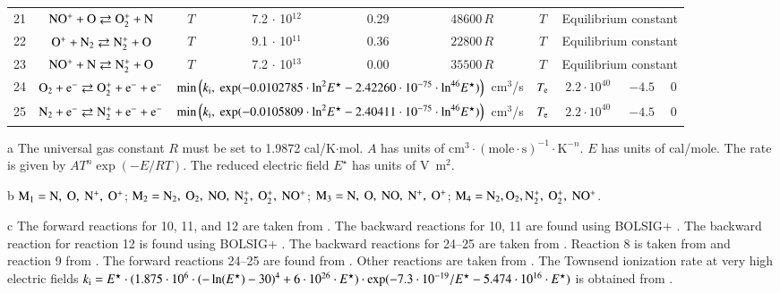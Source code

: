 \documentclass{warpdoc}
\begin{document}
\begin{table}[t]
\begin{center}
\begin{threeparttable}
\begin{tabular}{cccccccccc}
21 & $\rm NO^+ + O \rightleftarrows O_2^+ + N $ & $T$   & 7.2 $\cdot$ 10$^{12}$  & 0.29 & $48600 \, R$ & $T$ & \multicolumn{3}{c}{Equilibrium constant}\\

22 & $\rm O^+ + N_2 \rightleftarrows N_2^+ + O $ & $T$  & 9.1 $\cdot$ 10$^{11}$  & 0.36 & $22800 \, R$ & $T$  & \multicolumn{3}{c}{Equilibrium constant}\\

23 & $\rm NO^+ + N \rightleftarrows N_2^+ + O $  & $T$  & 7.2 $\cdot$ 10$^{13}$  & 0.00 & $35500 \, R$ & $T$ & \multicolumn{3}{c}{Equilibrium constant}\\

24 & $\rm O_2 + e^- \rightleftarrows O_2^+ + e^- + e^-$ &\multicolumn{4}{c}{$\min\left(k_{\rm i},~{\rm exp}(-0.0102785\cdot {\rm ln}^2 E^\star - 2.42260\cdot 10^{-75} \cdot {\rm ln}^{46}E^\star)\right)$~cm$^3$/s} 
                                          &$T_{\rm e}$ & $2.2 \cdot 10^{40}$  & $-4.5$  & 0\\
25 & $\rm N_2 + e^- \rightleftarrows N_2^+ + e^- + e^-$ &\multicolumn{4}{c}{$\min\left(k_{\rm i},~{\rm exp}(-0.0105809\cdot {\rm ln}^2 E^\star - 2.40411\cdot 10^{-75} \cdot {\rm ln}^{46}E^\star)\right)$~cm$^3$/s} 
                                          &$T_{\rm e}$ & $2.2 \cdot 10^{40}$  & $-4.5$  & 0\\
\bottomrule
\end{tabular}
\begin{tablenotes}
\item[{a}] The universal gas constant $R$ must be set to 1.9872	cal/K$\cdot$mol. $A$ has units of $\textrm{cm}^3\cdot(\textrm{mole}\cdot \textrm{s})^{-1}\cdot \textrm{K}^{-n}$. $E$ has units of cal/mole. The rate is given by $A T^n \exp(-E/RT).$ The reduced electric field $E^\star$ has units of V~m$^2$.
\item[{b}] $\rm M_1=N,~O,~N^+,~O^+$; $\rm M_2=N_2,~O_2,~NO,~N_2^+,~O_2^+,~NO^+$; $\rm M_3= N,~O,~NO,~N^+,~O^+$; $\rm M_4=N_2,O_2,N_2^+,~O_2^+,~NO^+$.
\item[{c}] The forward reactions for 10, 11, and 12 are taken from \cite{pf:2007:boyd}. The backward reactions for 10, 11 are found using BOLSIG+ \cite{psst:2005:hagelaar,jgr:1974:walls}. The backward reaction for reaction 12 is found using BOLSIG+ \cite{psst:2005:hagelaar,jap:2021:abdoulanziz}. The backward reactions for 24--25 are taken from \cite{nasa:1973:dunn}. Reaction 8 is taken from \cite{jcp:1997:bose} and reaction 9 from \cite{jcp:1996:bose}. The forward reactions 24--25 are found from \cite{jcp:2014:parent}. Other reactions are taken from \cite{book:1990:park}. The Townsend ionization rate at very high electric fields $k_{\rm i}=E^\star\cdot(1.875\cdot 10^6 \cdot (-\ln (E^\star)-30)^4+6\cdot 10^{26}\cdot E^\star)\cdot \exp(-7.3\cdot 10^{-19}/E^\star - 5.474\cdot 10^{16}\cdot E^\star)$ is obtained from \cite{ps:2005:tarasenko}.
\end{tablenotes}
\label{tab:parent2023b}
\end{threeparttable}
\end{center}
\end{table}
%


~
\newpage
~
\newpage
~
\newpage
~
\newpage
~
\newpage
~
\newpage
~
\newpage
~
\newpage
~
\newpage



\end{document}
